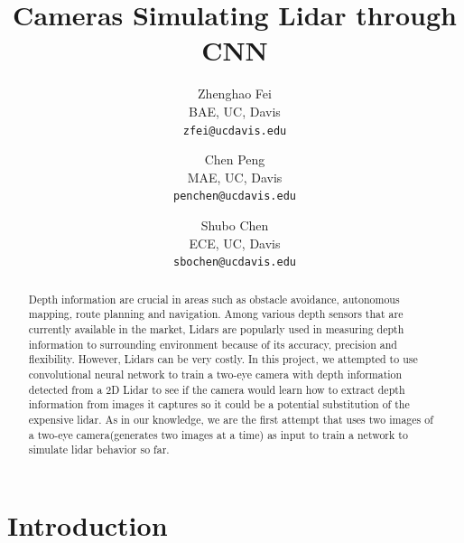 \documentclass[10pt,twocolumn,letterpaper]{article}
\begin{document}
\title{Cameras Simulating Lidar through CNN}

\author{Zhenghao Fei\\
BAE, UC, Davis\\
{\tt\small zfei@ucdavis.edu}
\and
Chen Peng\\
MAE, UC, Davis\\
{\tt\small penchen@ucdavis.edu}
\and
Shubo Chen\\
ECE, UC, Davis\\
{\tt\small sbochen@ucdavis.edu}
}
\maketitle

\begin{abstract}
Depth information are crucial in areas such as obstacle avoidance, autonomous mapping, route planning and navigation. Among various depth sensors that are currently available in the market, Lidars are popularly used in measuring depth information to surrounding environment because of its accuracy, precision and flexibility. However, Lidars can be very costly. In this project, we attempted to use convolutional neural network to train a two-eye camera with depth information detected from a 2D Lidar to see if the camera would learn how to extract depth information from images it captures so it could be a potential substitution of the expensive lidar. As in our knowledge, we are the first attempt that uses two images of a two-eye camera(generates two images at a time) as input to train a network to simulate lidar behavior so far. 
\end{abstract}

\section{Introduction}
\end{document}
